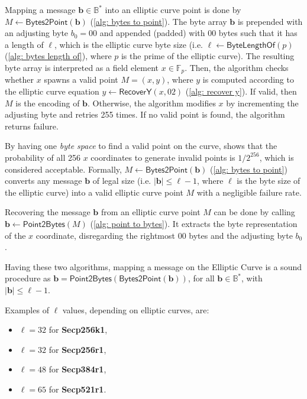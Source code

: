 Mapping a message $\boldsymbol{b} \in \mathbb{B}^*$ into an elliptic curve point is done by $M \gets \mathsf{Bytes2Point}(\boldsymbol{b})$ (\cref{alg: bytes to point}). The byte array $\boldsymbol{b}$ is prepended with an adjusting byte $b_0 = 00$ and appended (padded) with $00$ bytes such that it has a length of $\ell$, which is the elliptic curve byte size (i.e. $\ell \gets \mathsf{ByteLengthOf}(p)$ (\cref{alg: bytes length of}), where $p$ is the prime of the elliptic curve). The resulting byte array is interpreted as a field element $x \in \mathbb{F}_p$. Then, the algorithm checks whether $x$ spawns a valid point $M = (x, y)$, where $y$ is computed according to the elliptic curve equation $y \gets \mathsf{RecoverY}(x, 02)$ (\cref{alg: recover y}). If valid, then $M$ is the encoding of $\boldsymbol{b}$. Otherwise, the algorithm modifies $x$ by incrementing the adjusting byte and retries 255 times. If no valid point is found, the algorithm returns failure.

By having one \textit{byte space} to find a valid point on the curve, \cite{Trappe05} shows that the probability of all 256 $x$ coordinates to generate invalid points is $1/2^{256}$, which is considered acceptable. Formally, $M \gets \mathsf{Bytes2Point}(\boldsymbol{b})$ (\cref{alg: bytes to point}) converts any message $\boldsymbol{b}$ of legal size (i.e. $|\boldsymbol{b}| \leq \ell - 1$, where $\ell$ is the byte size of the elliptic curve) into a valid elliptic curve point $M$ with a negligible failure rate.

Recovering the message $\boldsymbol{b}$ from an elliptic curve point $M$ can be done by calling $\boldsymbol{b} \gets \mathsf{Point2Bytes}(M)$ (\cref{alg: point to bytes}). It extracts the byte representation of the $x$ coordinate, disregarding the rightmost $00$ bytes and the adjusting byte $b_0$.

Having these two algorithms, mapping a message on the Elliptic Curve is a sound procedure as $\boldsymbol{b} = \mathsf{Point2Bytes}(\mathsf{Bytes2Point}(\boldsymbol{b}))$, for all $\boldsymbol{b} \in \mathbb{B}^*$, with $|\boldsymbol{b}| \leq \ell - 1$.

Examples of $\ell$ values, depending on elliptic curves, are:
\begin{multicols}{2}
\begin{itemize}
    \item $\ell = 32$ for \textbf{Secp256k1},
    \item $\ell = 32$ for \textbf{Secp256r1},
    \item $\ell = 48$ for \textbf{Secp384r1},
    \item $\ell = 65$ for \textbf{Secp521r1}.
\end{itemize}
\end{multicols}

